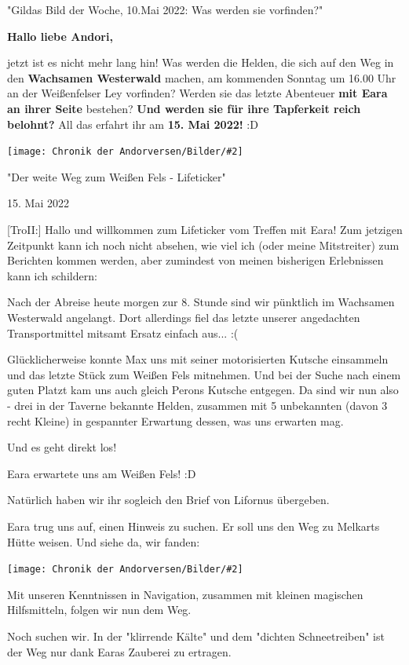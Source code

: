 \documentclass[10pt, a4paper, oneside]{book}
\newcommand{\bildmitts}[2][height=0.32\textwidth,width=0.48\textwidth,keepaspectratio]{%
    \begin{center}
        \texttt{[image: Chronik der Andorversen/Bilder/\#2]}
    \end{center}
}
\begin{document}
\begin{multicols}{2}
\begin{center}
    "Gildas Bild der Woche, 10.Mai 2022: Was werden sie vorfinden?"
\end{center}

\textbf{Hallo liebe Andori,}

jetzt ist es nicht mehr lang hin! Was werden die Helden, die sich auf den Weg in den \textbf{Wachsamen Westerwald} machen, am kommenden Sonntag um 16.00 Uhr an der Weißenfelser Ley vorfinden? Werden sie das letzte Abenteuer \textbf{mit Eara an ihrer Seite} bestehen? \textbf{Und werden sie für ihre Tapferkeit reich belohnt?} All das erfahrt ihr am \textbf{15. Mai 2022!} :D

\bildmitts{AA2022 Was werden sie vorfinden.jpeg}

\begin{center}
    "Der weite Weg zum Weißen Fels - Lifeticker"

    15. Mai 2022
\end{center}

[TroII:] Hallo und willkommen zum Lifeticker vom Treffen mit Eara! Zum jetzigen Zeitpunkt kann ich noch nicht absehen, wie viel ich (oder meine Mitstreiter) zum Berichten kommen werden, aber zumindest von meinen bisherigen Erlebnissen kann ich schildern:

Nach der Abreise heute morgen zur 8. Stunde sind wir pünktlich im Wachsamen Westerwald angelangt. Dort allerdings fiel das letzte unserer angedachten Transportmittel mitsamt Ersatz einfach aus... :(

Glücklicherweise konnte Max uns mit seiner motorisierten Kutsche einsammeln und das letzte Stück zum Weißen Fels mitnehmen. Und bei der Suche nach einem guten Platzt kam uns auch gleich Perons Kutsche entgegen. Da sind wir nun also - drei in der Taverne bekannte Helden, zusammen mit 5 unbekannten (davon 3 recht Kleine) in gespannter Erwartung dessen, was uns erwarten mag.

Und es geht direkt los!

Eara erwartete uns am Weißen Fels! :D

Natürlich haben wir ihr sogleich den Brief von Lifornus übergeben.

Eara trug uns auf, einen Hinweis zu suchen. Er soll uns den Weg zu Melkarts Hütte weisen. Und siehe da, wir fanden:

\bildmitts{AA2022 Tafel Eara.jpeg}

Mit unseren Kenntnissen in Navigation, zusammen mit kleinen magischen Hilfsmitteln, folgen wir nun dem Weg.

Noch suchen wir. In der "klirrende Kälte" und dem "dichten Schneetreiben" ist der Weg nur dank Earas Zauberei zu ertragen.


\end{multicols}
\end{document}
